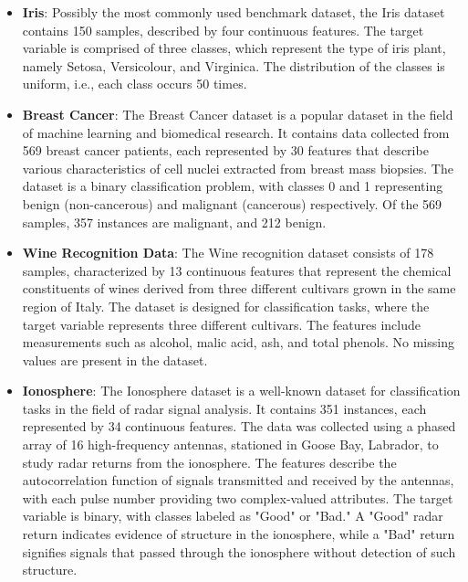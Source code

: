 \documentclass[conference]{IEEEtran}
\begin{document}
    \begin{itemize}
        \item \textbf{Iris}: Possibly the most commonly used benchmark dataset, the Iris dataset contains 150 samples, 
        described by four continuous features. The target variable is comprised of three classes, which represent the 
        type of iris plant, namely Setosa, Versicolour, and Virginica. The distribution of the classes is uniform, i.e., 
        each class occurs 50 times.
        
        \item \textbf{Breast Cancer}: The Breast Cancer dataset is a popular dataset in the field of machine learning and 
        biomedical research. It contains data collected from 569 breast cancer patients, each represented by 30 features 
        that describe various characteristics of cell nuclei extracted from breast mass biopsies. The dataset is a binary 
        classification problem, with classes 0 and 1 representing benign (non-cancerous) and malignant (cancerous) respectively. 
        Of the 569 samples, 357 instances are malignant, and 212 benign.
        
        \item \textbf{Wine Recognition Data}: The Wine recognition dataset consists of 178 samples, characterized by 13 
        continuous features that represent the chemical constituents of wines derived from three different cultivars grown 
        in the same region of Italy. The dataset is designed for classification tasks, where the target variable represents 
        three different cultivars. The features include measurements such as alcohol, malic acid, ash, and total phenols. 
        No missing values are present in the dataset.
        
        \item \textbf{Ionosphere}: The Ionosphere dataset is a well-known dataset for classification tasks in the field of 
        radar signal analysis. It contains 351 instances, each represented by 34 continuous features. The data was collected 
        using a phased array of 16 high-frequency antennas, stationed in Goose Bay, Labrador, to study radar returns from the 
        ionosphere. The features describe the autocorrelation function of signals transmitted and received by the antennas, 
        with each pulse number providing two complex-valued attributes. The target variable is binary, with classes labeled as 
        "Good" or "Bad." A "Good" radar return indicates evidence of structure in the ionosphere, while a "Bad" return signifies 
        signals that passed through the ionosphere without detection of such structure.
        

\end{itemize}
\end{document}
